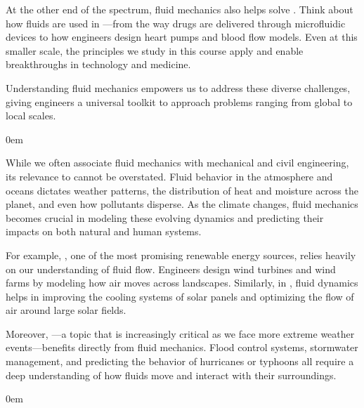 \documentclass[letterpaper,10pt,english]{jupyterBook}
\begin{document}
\sphinxAtStartPar
At the other end of the spectrum, fluid mechanics also helps solve . Think about how fluids are used in —from the way drugs are delivered through microfluidic devices to how engineers design heart pumps and blood flow models. Even at this smaller scale, the principles we study in this course apply and enable breakthroughs in technology and medicine.

\sphinxAtStartPar
Understanding fluid mechanics empowers us to address these diverse challenges, giving engineers a universal toolkit to approach problems ranging from global to local scales.

\begin{DUlineblock}{0em}
\item[] 
\end{DUlineblock}

\sphinxAtStartPar
While we often associate fluid mechanics with mechanical and civil engineering, its relevance to  cannot be overstated. Fluid behavior in the atmosphere and oceans dictates weather patterns, the distribution of heat and moisture across the planet, and even how pollutants disperse. As the climate changes, fluid mechanics becomes crucial in modeling these evolving dynamics and predicting their impacts on both natural and human systems.

\sphinxAtStartPar
For example, , one of the most promising renewable energy sources, relies heavily on our understanding of fluid flow. Engineers design wind turbines and wind farms by modeling how air moves across landscapes. Similarly, in , fluid dynamics helps in improving the cooling systems of solar panels and optimizing the flow of air around large solar fields.

\sphinxAtStartPar
Moreover, —a topic that is increasingly critical as we face more extreme weather events—benefits directly from fluid mechanics. Flood control systems, stormwater management, and predicting the behavior of hurricanes or typhoons all require a deep understanding of how fluids move and interact with their surroundings.

\begin{DUlineblock}{0em}
\item[] 
\end{DUlineblock}
\end{document}
